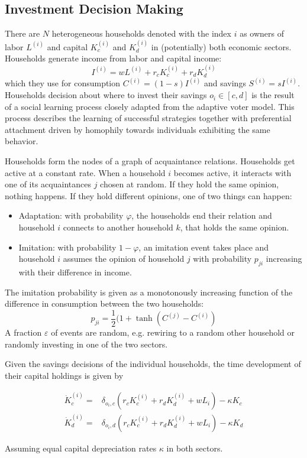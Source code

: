 \subsection{Investment Decision Making}

There are $N$ heterogeneous households denoted with the index $i$ as owners of labor $L^{(i)}$ and capital $K_c^{(i)}$ and $K_d^{(i)}$ in (potentially) both economic sectors.
Households generate income from labor and capital income:
\begin{equation}
	I^{(i)} = w L^{(i)} + r_c K_c^{(i)} + r_d K_d^{(i)}
	\label{household_income}
\end{equation}
which they use for consumption $C^{(i)} = (1-s) I^{(i)}$ and savings $S^{(i)} = s I^{(i)}$. Households decision about where to invest their savings $o_i \in [c,d]$ is the result of a social learning process closely adapted from the adaptive voter model. This process describes the learning of successful strategies together with preferential attachment driven by homophily towards individuals exhibiting the same behavior.

Households form the nodes of a graph of acquaintance relations. Households get active at a constant rate. When a household $i$ becomes active, it interacts with one of its acquaintances $j$ chosen at random. If they hold the same opinion, nothing happens. If they hold different opinions, one of two things can happen:
\begin{itemize}
	\item Adaptation: with probability $\varphi$, the households end their relation and household $i$ connects to another household $k$, that holds the same opinion. 
	\item Imitation: with probability $1-\varphi$, an imitation event takes place and household $i$ assumes the opinion of household $j$ with probability $p_{ji}$ increasing with their difference in income.
\end{itemize}
The imitation probability is given as a monotonously increasing function of the difference in consumption between the two households:
\begin{equation}
	p_{ji} = \frac{1}{2}(1 + \tanh \left( C^{(j)} - C^{(i)}  \right)
	\label{imitation_probability}
\end{equation}
A fraction $\varepsilon$ of events are random, e.g. rewiring to a random other household or randomly investing in one of the two sectors.

Given the savings decisions of the individual households, the time development of their capital holdings is given by

\begin{align}
	\dot{K}_c^{(i)} =& \delta_{o_i, c} \left( r_c K_c^{(i)} + r_d K_d^{(i)} + w L_i \right) - \kappa K_c \\
	\dot{K}_d^{(i)} =& \delta_{o_i, d} \left( r_c K_c^{(i)} + r_d K_d^{(i)} + w L_i \right) - \kappa K_d 
\end{align}

Assuming equal capital depreciation rates $\kappa$ in both sectors.
